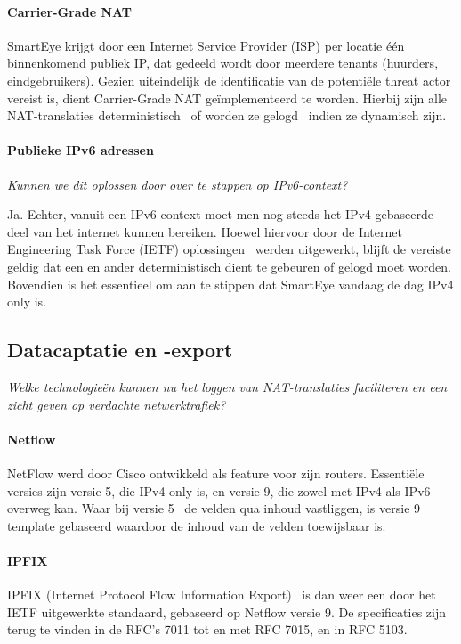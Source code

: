 \paragraph{Carrier-Grade NAT}
SmartEye krijgt door een Internet Service Provider (ISP) per locatie één binnenkomend publiek IP, dat gedeeld wordt door meerdere tenants (huurders, eindgebruikers). Gezien uiteindelijk de identificatie van de potentiële threat actor vereist is, dient Carrier-Grade NAT geïmplementeerd te worden. Hierbij zijn alle NAT-translaties deterministisch~\autocite{Donley2014} of worden ze gelogd~\autocite{Perreault2013} indien ze dynamisch zijn.

\paragraph{Publieke IPv6 adressen}
\emph{Kunnen we dit oplossen door over te stappen op IPv6-context?}

Ja. Echter, vanuit een IPv6-context moet men nog steeds het IPv4 gebaseerde deel van het internet kunnen bereiken. Hoewel hiervoor door de Internet Engineering Task Force (IETF) oplossingen~\autocite{Arkko2011} werden uitgewerkt, blijft de vereiste geldig dat een en ander deterministisch dient te gebeuren of gelogd moet worden. Bovendien is het essentieel om aan te stippen dat SmartEye vandaag de dag IPv4 only is.

\subsection{Datacaptatie en -export}
\emph{Welke technologieën kunnen nu het loggen van NAT-translaties faciliteren en een zicht geven op verdachte netwerktrafiek?}

\paragraph{Netflow}
NetFlow werd door Cisco ontwikkeld als feature voor zijn routers. Essentiële versies zijn versie 5, die IPv4 only is, en versie 9, die zowel met IPv4 als IPv6 overweg kan. Waar bij versie 5~\autocite{Cisco2007} de velden qua inhoud vastliggen, is versie 9~\autocite{Claise2004} template gebaseerd waardoor de inhoud van de velden toewijsbaar is.
\paragraph{IPFIX}
IPFIX (Internet Protocol Flow Information Export)~\autocite{Aitken2013} is dan weer een door het IETF uitgewerkte standaard, gebaseerd op Netflow versie 9. De specificaties zijn terug te vinden in de RFC’s 7011 tot en met RFC 7015, en in RFC 5103.
